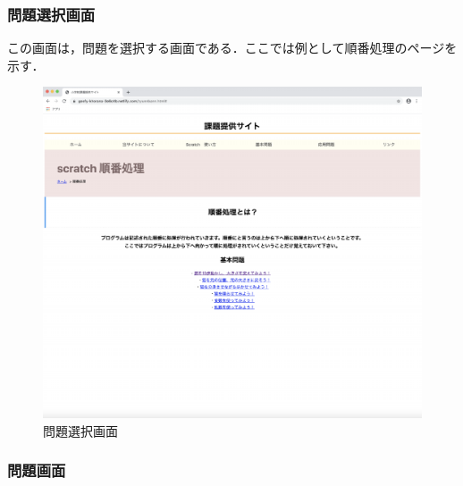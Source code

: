 \newpage

\subsubsection{問題選択画面}
この画面は，問題を選択する画面である．ここでは例として順番処理のページを示す．

\begin{figure}[h]
\begin{center}
\includegraphics[width=15cm]{zyunnbann.pdf}
\caption{問題選択画面}
\label{fig:houhou}
\end{center}
\end{figure}

\newpage

\subsubsection{問題画面}

